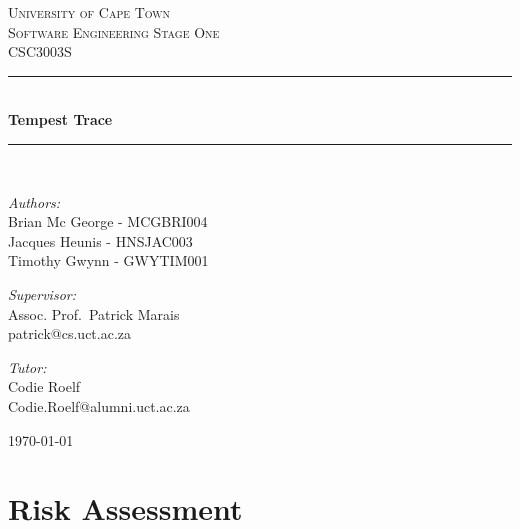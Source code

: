 \documentclass[a4paper,10pt]{article}
\begin{document}
\begin{titlepage} \begin{center} 
		\textsc{\LARGE University of Cape Town}
		\\[1.5cm] \textsc{\Large Software Engineering Stage One\\CSC3003S}
		\\[0.5cm]
		\noindent\rule[0.4mm]{\textwidth}{0.1mm}
		\\[0.4cm] { \huge \bfseries Tempest Trace \\[0.4cm] }
		\noindent\rule[0.4mm]{\textwidth}{0.1mm}
		\\[1cm]
		\begin{minipage}[t]{0.4\textwidth}
		\begin{flushleft}\large \emph{Authors:}\\ Brian Mc George - MCGBRI004 \\ Jacques Heunis - HNSJAC003 \\ Timothy Gwynn - GWYTIM001\end{flushleft}
		 \end{minipage} \begin{minipage}[t]{0.4\textwidth} 
		\begin{flushright} \large \emph{Supervisor:} \\ Assoc. Prof.~Patrick Marais\\patrick@cs.uct.ac.za\end{flushright}
		\begin{flushright} \large \emph{Tutor:} \\ Codie Roelf\\Codie.Roelf@alumni.uct.ac.za\end{flushright}
		 \end{minipage} \vfill {\large \today}
		\end{center}
		\end{titlepage}
\newpage
\tableofcontents
\newpage

\section{Risk Assessment}
\end{document}
